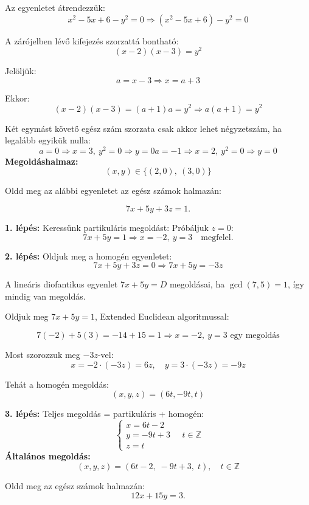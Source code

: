 \begin{solution}
	Az egyenletet átrendezzük: 
	\[
	x^{2}-5x+6-y^{2}=0\Rightarrow(x^{2}-5x+6)-y^{2}=0
	\]
	
	A zárójelben lévő kifejezés szorzattá bontható: 
	\[
	(x-2)(x-3)=y^{2}
	\]
	
	Jelöljük: 
	\[
	a=x-3\Rightarrow x=a+3
	\]
	
	Ekkor: 
	\[
	(x-2)(x-3)=(a+1)a=y^{2}\Rightarrow a(a+1)=y^{2}
	\]
	
	Két egymást követő egész szám szorzata csak akkor lehet négyzetszám,
	ha legalább egyikük nulla: 
	\[
	a=0\Rightarrow x=3,\ y^{2}=0\Rightarrow y=0a=-1\Rightarrow x=2,\ y^{2}=0\Rightarrow y=0
	\]
	\textbf{Megoldáshalmaz:}\\
	\[
	\boxed{(x,y)\in\{(2,0),\ (3,0)\}}
	\]
\end{solution}
\begin{problem}
	Oldd meg az alábbi egyenletet az egész számok halmazán:
	
	\[
	7x+5y+3z=1.
	\]
\end{problem}

\begin{solution}
	\textbf{1. lépés:} Keressünk partikuláris megoldást: Próbáljuk $z=0$:
	\[
	7x+5y=1\Rightarrow x=-2,\ y=3\quad\text{megfelel.}
	\]
	
	\textbf{2. lépés:} Oldjuk meg a homogén egyenletet: 
	\[
	7x+5y+3z=0\Rightarrow7x+5y=-3z
	\]
	
	A lineáris diofantikus egyenlet $7x+5y=D$ megoldásai, ha $\gcd(7,5)=1$,
	így mindig van megoldás.
	
	Oldjuk meg $7x+5y=1$, Extended Euclidean algoritmussal:
	
	\[
	7(-2)+5(3)=-14+15=1\Rightarrow x=-2,\ y=3\text{ egy megoldás}
	\]
	
	Most szorozzuk meg $-3z$-vel: 
	\[
	x=-2\cdot(-3z)=6z,\quad y=3\cdot(-3z)=-9z
	\]
	
	Tehát a homogén megoldás: 
	\[
	(x,y,z)=(6t,-9t,t)
	\]
	
	\textbf{3. lépés:} Teljes megoldás = partikuláris + homogén: 
	\[
	\begin{cases}
		x=6t-2\\
		y=-9t+3\\
		z=t
	\end{cases}\quad t\in\mathbb{Z}
	\]
	\textbf{Általános megoldás:}\\
	\[
	(x,y,z)=(6t-2,\;-9t+3,\;t),\quad t\in\mathbb{Z}
	\]
\end{solution}
\begin{problem}
	Oldd meg az egész számok halmazán: 
	\[
	12x+15y=3.
	\]
\end{problem}

